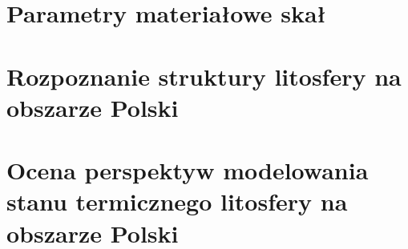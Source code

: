 \documentclass[11.5pt,twoside]{report}
\renewcommand{\headrulewidth}{0pt}}
\begin{document}
\chapter{Parametry materiałowe skał}


\chapter{Rozpoznanie struktury litosfery na obszarze Polski}

\chapter{Ocena perspektyw modelowania stanu termicznego litosfery na obszarze Polski}

\renewcommand\headrulewidth{0pt} %
{\renewcommand{\markboth}[2]{} %
	\printbibliography[heading=bibintoc,title=Bibliografia]} %
\end{document}

